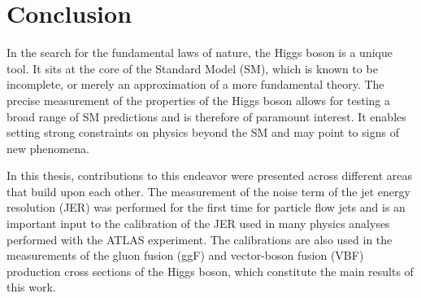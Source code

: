 \chapter{Conclusion}
\label{chap:conclusion}
In the search for the fundamental laws of nature, the Higgs boson is a unique tool. 
It sits at the core of the Standard Model (SM), which is known to be incomplete, or merely an approximation of a more fundamental theory. 
The precise measurement of the properties of the Higgs boson allows for testing a broad range of SM predictions and is therefore of paramount interest.
It enables setting strong constraints on physics beyond the SM and may point to signs of new phenomena. %

In this thesis, contributions to this endeavor were presented across different areas that build upon each other. 
The measurement of the noise term of the jet energy resolution (JER) was performed for the first time for particle flow jets and is an important input to the calibration of the JER used in many physics analyses performed with the ATLAS experiment. 
The calibrations are also used in the measurements of the gluon fusion (ggF) and vector-boson fusion (VBF) production cross sections of the Higgs boson, which constitute the main results of this work. 

